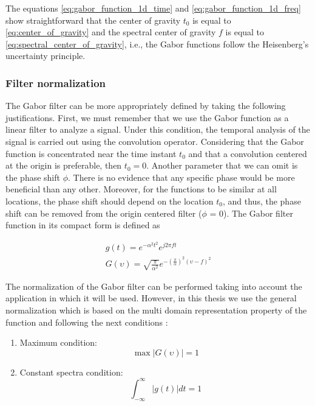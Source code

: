 The equations \eqref{eq:gabor_function_1d_time} and \eqref{eq:gabor_function_1d_freq} show straightforward that the center of gravity $t_0$ is equal to \eqref{eq:center_of_gravity} and the spectral center of gravity $f$ is equal to \eqref{eq:spectral_center_of_gravity}, i.e., the Gabor functions follow the Heisenberg's uncertainty principle.   


\subsubsection{Filter normalization} \label{subsec:filter_normalization}

The Gabor filter can be more appropriately defined by taking the following justifications. First, we must remember that we use the Gabor function as a linear filter to analyze a signal. Under this condition, the temporal analysis of the signal is carried out using the convolution operator. Considering that the Gabor function is concentrated near the time instant $t_0$ and that a convolution centered at the origin is preferable, then $t_0 = 0$. Another parameter that we can omit is the phase shift $\phi$. There is no evidence that any specific phase would be more beneficial than any other. Moreover, for the functions to be similar at all locations, the phase shift should depend on the location $t_0$, and thus, the phase shift can be removed from the origin centered filter ($\phi$ = 0). The Gabor filter function in its compact form is defined as 

\begin{equation}\label{eq:gabor_function_1d_timefreq_compact}
    \begin{gathered}
         g(t) =  e ^{-\alpha^2 t^2} e ^{j 2 \pi f t } \\
         G(\upsilon) =  \sqrt{\frac{\pi}{\alpha^2}} e ^{-\left(\frac{\pi}{\alpha}\right) ^{2} (\upsilon-f)^2} 
     \end{gathered}
\end{equation}

The normalization of the Gabor filter can be performed taking into account the application in which it will be used. However, in this thesis we use the general normalization which is based on the multi domain representation property of the function and following the next conditions \cite{Boukerroui.Noble.ea:JMIV:2004}:

\begin{enumerate}
    \item Maximum condition:
        \begin{equation}\label{eq:maximun_condition}
            \max{|G(\upsilon)|} = 1
        \end{equation}
    \item Constant spectra condition:
        \begin{equation}\label{eq:constant_spectrum_condition}
            \int_{-\infty}^{\infty} |g(t)| dt = 1
        \end{equation}        
\end{enumerate}


